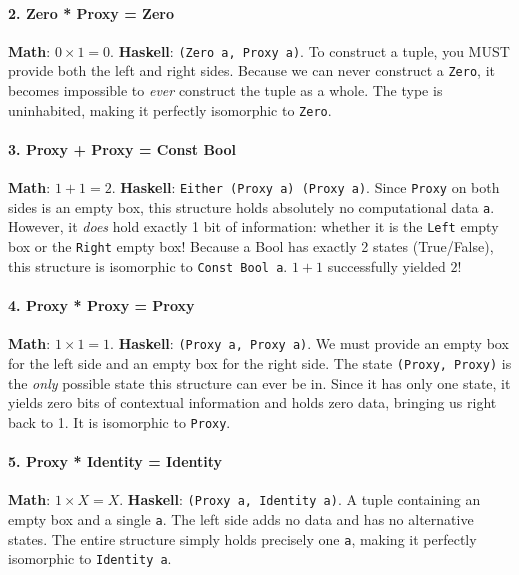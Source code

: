 \documentclass[
]{article}
\begin{document}
\paragraph{2. Zero * Proxy = Zero}\label{zero-proxy-zero}

\textbf{Math}: \(0 \times 1 = 0\). \textbf{Haskell}:
\texttt{(Zero\ a,\ Proxy\ a)}. To construct a tuple, you MUST provide
both the left and right sides. Because we can never construct a
\texttt{Zero}, it becomes impossible to \emph{ever} construct the tuple
as a whole. The type is uninhabited, making it perfectly isomorphic to
\texttt{Zero}.

\paragraph{3. Proxy + Proxy = Const Bool}\label{proxy-proxy-const-bool}

\textbf{Math}: \(1 + 1 = 2\). \textbf{Haskell}:
\texttt{Either\ (Proxy\ a)\ (Proxy\ a)}. Since \texttt{Proxy} on both
sides is an empty box, this structure holds absolutely no computational
data \texttt{a}. However, it \emph{does} hold exactly 1 bit of
information: whether it is the \texttt{Left} empty box or the
\texttt{Right} empty box! Because a Bool has exactly 2 states
(True/False), this structure is isomorphic to \texttt{Const\ Bool\ a}.
\(1 + 1\) successfully yielded \(2\)!

\paragraph{4. Proxy * Proxy = Proxy}\label{proxy-proxy-proxy}

\textbf{Math}: \(1 \times 1 = 1\). \textbf{Haskell}:
\texttt{(Proxy\ a,\ Proxy\ a)}. We must provide an empty box for the
left side and an empty box for the right side. The state
\texttt{(Proxy,\ Proxy)} is the \emph{only} possible state this
structure can ever be in. Since it has only one state, it yields zero
bits of contextual information and holds zero data, bringing us right
back to 1. It is isomorphic to \texttt{Proxy}.

\paragraph{5. Proxy * Identity =
Identity}\label{proxy-identity-identity}

\textbf{Math}: \(1 \times X = X\). \textbf{Haskell}:
\texttt{(Proxy\ a,\ Identity\ a)}. A tuple containing an empty box and a
single \texttt{a}. The left side adds no data and has no alternative
states. The entire structure simply holds precisely one \texttt{a},
making it perfectly isomorphic to \texttt{Identity\ a}.
\end{document}

